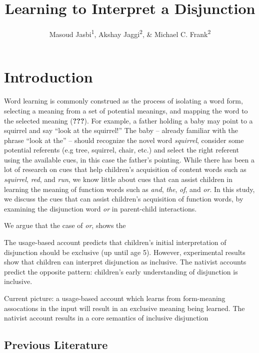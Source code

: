 \documentclass[floatsintext,man]{apa6}
\title{Learning to Interpret a Disjunction}
\author{Masoud Jasbi\textsuperscript{1}, Akshay Jaggi\textsuperscript{2}, \& Michael C. Frank\textsuperscript{2}}
\affiliation{
    \vspace{0.5cm}
          \textsuperscript{1} Harvard University\\
          \textsuperscript{2} Stanford University  }
\theoremstyle{definition}
\theoremstyle{definition}
\theoremstyle{definition}
\theoremstyle{remark}
\begin{document}
\maketitle

\setcounter{secnumdepth}{0}



\section{Introduction}\label{introduction}

Word learning is commonly construed as the process of isolating a word
form, selecting a meaning from a set of potential meanings, and mapping
the word to the selected meaning ({\textbf{???}}). For example, a father
holding a baby may point to a squirrel and say \enquote{look at the
squirrel!} The baby -- already familiar with the phrase \enquote{look at
the} -- should recognize the novel word \emph{squirrel}, consider some
potential referents (e.g tree, squirrel, chair, etc.) and select the
right referent using the available cues, in this case the father's
pointing. While there has been a lot of research on cues that help
children's acquisition of content words such as \emph{squirrel},
\emph{red}, and \emph{run}, we know little about cues that can assist
children in learning the meaning of function words such as \emph{and},
\emph{the}, \emph{of}, and \emph{or}. In this study, we discuss the cues
that can assist children's acquisition of function words, by examining
the disjunction word \emph{or} in parent-child interactions.

We argue that the case of \emph{or}, shows the

The usage-based account predicts that children's initial interpretation
of disjunction should be exclusive (up until age 5). However,
experimental results show that children can interpret disjunction as
inclusive. The nativist accounts predict the opposite pattern:
children's early understanding of disjunction is inclusive.

Current picture: a usage-based account which learns from form-meaning
assocations in the input will result in an exclusive meaning being
learned. The nativist account results in a core semantics of inclusive
disjunction

\subsection{Previous Literature}\label{previous-literature}
\end{document}
